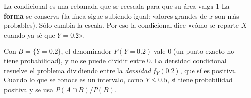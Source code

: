 \begin{afondo}{La condicional es una rebanada que se reescala para que su área valga 1}
La \textbf{forma} se conserva (la línea sigue subiendo igual: valores grandes de $x$ son más probables). Sólo cambia la escala.
Por eso la condicional dice «cómo se reparte $X$ cuando ya sé que $Y=0.2$».

Con $B=\{Y=0.2\}$, el denominador $P(Y=0.2)$ vale 0 (un punto exacto no tiene probabilidad), y no se puede dividir entre 0.
La densidad condicional resuelve el problema dividiendo entre la \emph{densidad} $f_Y(0.2)$, que sí es positiva.
Cuando lo que se conoce es un intervalo, como $Y\le0.5$, sí tiene probabilidad positiva y se usa $P(A\cap B)/P(B)$.
\end{afondo}

